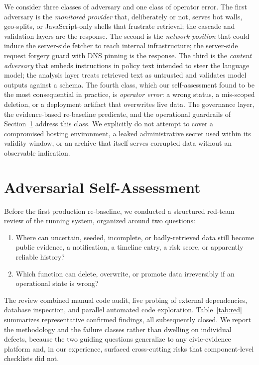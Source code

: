 \documentclass[11pt]{article}
\begin{document}
We consider three classes of adversary and one class of operator error. The
first adversary is the \emph{monitored provider} that, deliberately or not,
serves bot walls, geo-splits, or JavaScript-only shells that frustrate
retrieval; the cascade and validation layers are the response. The second is the
\emph{network position} that could induce the server-side fetcher to reach
internal infrastructure; the server-side request forgery guard with DNS pinning
is the response. The third is the \emph{content adversary} that embeds
instructions in policy text intended to steer the language model; the analysis
layer treats retrieved text as untrusted and validates model outputs against a
schema. The fourth class, which our self-assessment found to be the most
consequential in practice, is \emph{operator error}: a wrong status, a
mis-scoped deletion, or a deployment artifact that overwrites live data. The
governance layer, the evidence-based re-baseline predicate, and the operational
guardrails of Section~\ref{sec:redteam} address this class. We explicitly do not
attempt to cover a compromised hosting environment, a leaked administrative
secret used within its validity window, or an archive that itself serves
corrupted data without an observable indication.

\section{Adversarial Self-Assessment}
\label{sec:redteam}

Before the first production re-baseline, we conducted a structured red-team
review of the running system, organized around two questions:

\begin{enumerate}[leftmargin=*]
  \item Where can uncertain, seeded, incomplete, or badly-retrieved data still
  become public evidence, a notification, a timeline entry, a risk score, or
  apparently reliable history?
  \item Which function can delete, overwrite, or promote data irreversibly if an
  operational state is wrong?
\end{enumerate}

The review combined manual code audit, live probing of external dependencies,
database inspection, and parallel automated code exploration. Table~\ref{tab:red}
summarizes representative confirmed findings, all subsequently closed. We report
the methodology and the failure classes rather than dwelling on individual
defects, because the two guiding questions generalize to any civic-evidence
platform and, in our experience, surfaced cross-cutting risks that
component-level checklists did not.
\end{document}
